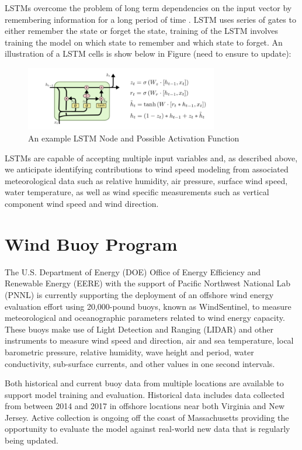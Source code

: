\documentclass{llncs}
\begin{document}
LSTMs overcome the problem of long term dependencies on the input vector by remembering information for a long period of time . LSTM uses series of gates to either remember the state or forget the state, training of the LSTM involves training the model on which state to remember and which state to forget.  An illustration of a LSTM cells is show below in Figure (need to ensure to update):

\begin{figure}
  \centering
  \includegraphics[width=0.75\textwidth]{LSTM_graphic.png}
  \caption{An example LSTM Node and Possible Activation Function}
  \label{fig:LSTMNode}
\end{figure}

LSTMs are capable of accepting multiple input variables and, as described above, we anticipate identifying contributions to wind speed modeling from associated meteorological data such as relative humidity, air pressure, surface wind speed, water temperature, as well as wind specific measurements such as vertical component wind speed and wind direction.

\section{Wind Buoy Program}

The U.S. Department of Energy (DOE) Office of Energy Efficiency and Renewable Energy (EERE) with the support of Pacific Northwest National Lab (PNNL) is currently supporting the deployment of an offshore wind energy evaluation effort using 20,000-pound buoys, known as WindSentinel, to measure meteorological and oceanographic parameters related to wind energy capacity. These buoys make use of Light Detection and Ranging (LIDAR) and other instruments to measure wind speed and direction, air and sea temperature, local barometric pressure, relative humidity, wave height and period, water conductivity, sub-surface currents, and other values in one second intervals. \cite{DOE}

Both historical and current buoy data from multiple locations are available to support model training and evaluation. Historical data includes data collected from between 2014 and 2017 in offshore locations near both Virginia and New Jersey. Active collection is ongoing off the coast of Massachusetts providing the opportunity to evaluate the model against real-world new data that is regularly being updated.
\end{document}
